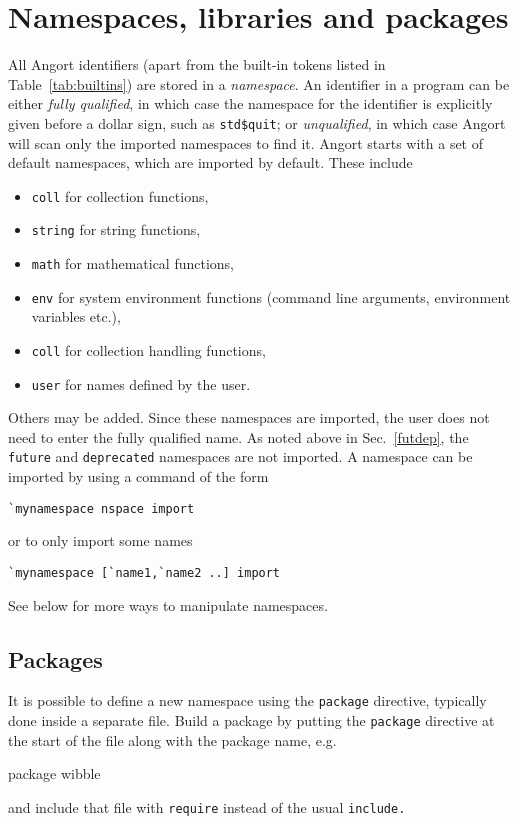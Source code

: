 \section{Namespaces, libraries and packages}
\label{namespaces}
\def\dollarsign{\$}\indw{\dollarsign}
All Angort identifiers (apart from the built-in tokens listed in Table~\ref{tab:builtins})
are stored in a \emph{namespace}. An identifier in a program
can be either \emph{fully qualified},
in which case the namespace for the identifier is explicitly given before
a dollar sign, such as \verb+std$quit+; or \emph{unqualified}, in
which case Angort will scan only the imported namespaces to find it.
Angort starts with a set of default namespaces, which are imported
by default. These include
\begin{itemize}
\item \texttt{coll} for collection functions,
\item \texttt{string} for string functions,
\item \texttt{math} for mathematical functions,
\item \texttt{env} for system environment functions (command line arguments,
environment variables etc.),
\item \texttt{coll} for collection handling functions,
\item \texttt{user} for names defined by the user.
\end{itemize}
Others may be added. Since these namespaces are imported, the user
does not need to enter the fully qualified name. As noted above in Sec.~\ref{futdep},
the \texttt{future} and \texttt{deprecated} namespaces are not imported.
A namespace can be imported by using a command of the form
\begin{lstlisting}
`mynamespace nspace import
\end{lstlisting}
or to only import some names
\begin{lstlisting}
`mynamespace [`name1,`name2 ..] import
\end{lstlisting}
See below for more ways to manipulate namespaces.


\subsection{Packages}
\label{packages}
It is possible to define a new namespace using the \texttt{package}
directive, typically done inside a separate file.
Build a package by putting the \texttt{package} directive at the start
of the file along with the package name, e.g.
\begin{v}
package wibble
\end{v}
and include that file with \texttt{require} instead of the usual \texttt{include.} 


